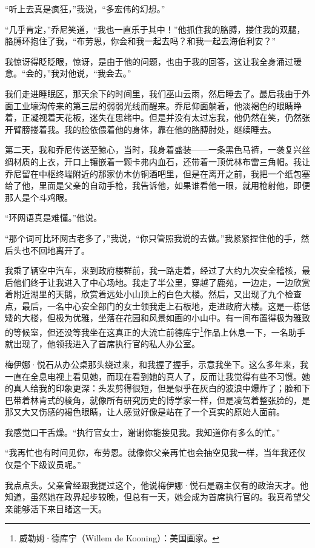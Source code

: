 \documentclass[AutoFakeBold=true]{book}
\begin{document}
``听上去真是疯狂，''我说，``多宏伟的幻想。''

``几乎肯定，''乔尼笑道，``我也一直乐于其中！''他抓住我的胳膊，搂住我的双腿，胳膊环抱住了我，``布劳恩，你会和我一起去吗？和我一起去海伯利安？''

我惊讶得眨眨眼，惊讶，是由于他的问题，也由于我的回答，这让我全身涌过暖意。``会的，''我对他说，``我会去。''

我们走进睡眠区，那天余下的时间里，我们巫山云雨，然后睡去了。最后我由于外面工业壕沟传来的第三层的弱弱光线而醒来。乔尼仰面躺着，他淡褐色的眼睛睁着，正凝视着天花板，迷失在思绪中。但是并没有太过忘我，他仍然在笑，仍然张开臂膀搂着我。我的脸依偎着他的身体，靠在他的胳膊肘处，继续睡去。

\vspace*{1em}

第二天，我和乔尼传送至鲸心，当时，我身着盛装——一条黑色马裤，一袭复兴丝绸材质的上衣，开口上镶嵌着一颗卡弗内血石，还带着一顶优林布雷三角帽。我让乔尼留在中枢终端附近的那家仿木仿铜酒吧里，但是在离开之前，我把一个纸包塞给了他，里面是父亲的自动手枪，我告诉他，如果谁看他一眼，就用枪射他，即便那人是个斗鸡眼。

``环网语真是难懂。''他说。

``那个词可比环网古老多了，''我说，``你只管照我说的去做。''我紧紧捏住他的手，然后头也不回地离开了。

我乘了辆空中汽车，来到政府楼群前，我一路走着，经过了大约九次安全稽核，最后他们终于让我进入了中心场地。我走了半公里，穿越了鹿苑，一边走，一边欣赏着附近湖里的天鹅，欣赏着远处小山顶上的白色大楼。然后，又出现了九个检查点，最后，一名中心安全部门的女士领我走上石板地，走进政府大楼。这是一栋低矮的大楼，但极为优雅，坐落在花园和风景如画的小山中。有一间布置得极为雅致的等候室，但还没等我坐在这真正的大流亡前德库宁\footnote{威勒姆·德库宁（Willem de Kooning）：美国画家。}作品上休息一下，一名助手就出现了，他领我进入了首席执行官的私人办公室。

梅伊娜·悦石从办公桌那头绕过来，和我握了握手，示意我坐下。这么多年来，我一直在全息电视上看见她，而现在看到她的真人了，反而让我觉得有些不习惯。她的真人给我的印象更深：头发剪得很短，但是似乎在灰白的波浪中爆炸了；脸和下巴带着林肯式的棱角，就像所有研究历史的博学家一样，但是凌驾着整张脸的，是那又大又伤感的褐色眼睛，让人感觉好像是站在了一个真实的原始人面前。

我感觉口干舌燥。``执行官女士，谢谢你能接见我。我知道你有多么的忙。''

``我再忙也有时间见你，布劳恩。就像你父亲再忙也会抽空见我一样，当年我还仅仅是个下级议员呢。''

我点点头。父亲曾经跟我提过这个，他说梅伊娜·悦石是霸主仅有的政治天才。他知道，虽然她在政界起步较晚，但总有一天，她会成为首席执行官的。我真希望父亲能够活下来目睹这一天。
\end{document}
